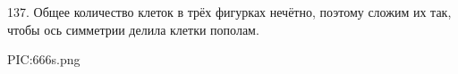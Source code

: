 137. Общее количество клеток в трёх фигурках нечётно, поэтому сложим их так, чтобы ось симметрии делила клетки пополам.
\begin{center}
{{PIC:666s.png}}
\end{center}
